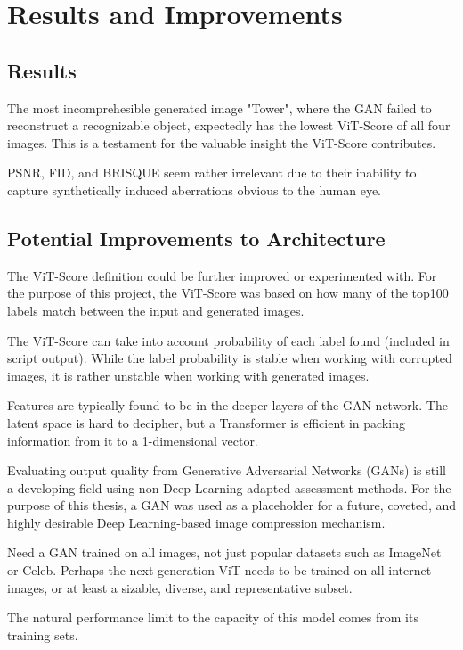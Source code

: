 \section{Results and Improvements}

\subsection{Results}

The most incomprehesible generated image "Tower", where the GAN failed to reconstruct a recognizable
object, expectedly has the lowest ViT-Score of all four images. This is a testament for the valuable 
insight the ViT-Score contributes.


PSNR, FID, and BRISQUE seem rather irrelevant due to their inability to capture synthetically induced
aberrations obvious to the human eye.

\subsection{Potential Improvements to Architecture}

The ViT-Score definition could be further improved or experimented with.
For the purpose of this project, the ViT-Score was based on how many of the top100 labels match
between the input and generated images.

The ViT-Score can take into account probability of each label found (included in script output).
While the label probability is stable when working with corrupted images, it is rather 
unstable when working with generated images.

Features are typically found to be in the deeper layers of the GAN network. 
The latent space is hard to decipher, but a Transformer is efficient in packing information from it 
to a 1-dimensional vector.

Evaluating output quality from Generative Adversarial Networks (GANs) is 
still a developing field using non-Deep Learning-adapted assessment methods. 
For the purpose of this thesis, a GAN was used as a placeholder 
for a future, coveted, and highly desirable Deep Learning-based image compression mechanism.

Need a GAN trained on all images, not just popular datasets such as ImageNet or Celeb. 
Perhaps the next generation ViT needs to be trained on all internet images, or at least a sizable, diverse, and
representative subset.

The natural performance limit to the capacity of this model comes from its training sets.

